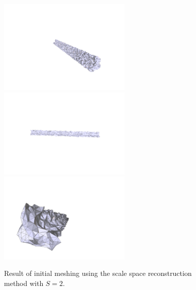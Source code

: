 \documentclass[12pt]{drexelthesis}
\begin{document}
\begin{figure}[!ht] 
	
	\centering
		\includegraphics[trim={5in 2in 1.5in 3in},clip,width=2.5in]{simulated-lab-scan/2cmnoise/2cmmesh/scalespace200.png}
		\includegraphics[width=2.5in]{simulated-lab-scan/2cmnoise/2cmmesh/scalespace201.png}
		\includegraphics[width=2.5in]{simulated-lab-scan/2cmnoise/2cmmesh/scalespace202.png}
		\caption[Initial meshing using a scale space reconstruction with $S = 2$]{\centering  Result of initial meshing using the scale space reconstruction method with $S = 2$.}
		\label{2cmnoise:scalepspace2}
\end{figure}
\end{document}
